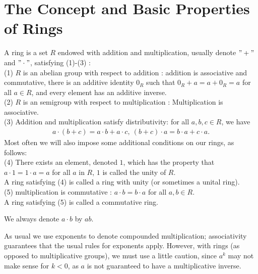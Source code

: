 \chapter{The Concept and Basic Properties of Rings}\label{chp:4_1}

\begin{definition}{}{}
    A ring is a set $R$ endowed with addition and multiplication, usually denote $"+"$ and $"\cdot"$, satisfying (1)-(3) :
    \\
    (1) $R$ is an abelian group with respect to addition : addition is associative and commutative, there is an additive identity $0_R$
    such that $0_R + a=a+0_R = a$ for all $a\in R$, and every element has an additive inverse.\\
    (2) $R$ is an semigroup with respect to multiplication : Multiplication is associative.
    \\
    (3) Addition and multiplication satisfy distributivity: for all $a, b, c \in R$, we have
    \begin{align*}
        a\cdot(b+c)=a\cdot b + a\cdot c, \ (b+c)\cdot a = b\cdot a+c\cdot a.
    \end{align*}
    Most often we will also impose some additional conditions on our rings, as follows:\\

    (4) There exists an element, denoted $1$, which has the property that $a \cdot 1 = 1 \cdot a = a$ for all $a$ in
    $R$, $1$ is called the unity of $R$.\\
    A ring satisfying (4) is called a ring with unity (or sometimes a unital ring).
    \\

    (5) multiplication is commutative : $a\cdot b=b\cdot a$ for all $a,b\in R$. \\
    A ring satisfying (5) is called a commutative ring.    
\end{definition}



\begin{remark}
    We always denote $a\cdot b$ by $ab$.
\end{remark}

\begin{remark}
    As usual we use exponents to denote compounded multiplication; associativity guarantees that the
usual rules for exponents apply. However, with rings (as opposed to multiplicative groups), we must use
a little caution, since $a^k$ may not make sense for $k < 0$, as $a$ is not guaranteed to have a multiplicative
inverse.
\end{remark}


